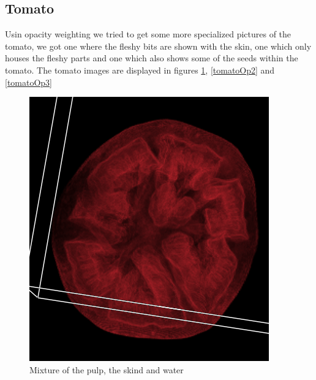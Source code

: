 \documentclass[a4paper,twoside,11pt]{article}
\begin{document}
 \subsection{Tomato}
 Usin opacity weighting we tried to get some more specialized pictures of the tomato, we got one where the fleshy bits are shown with the skin, one which only houses the fleshy parts and one which also shows some of the seeds within the tomato. The tomato images are displayed in figures \ref{tomatoOp}, \ref{tomatoOp2} and \ref{tomatoOp3}
 \begin{figure}[htb]
  \includegraphics[width=\linewidth]{images/tomatoOp}
  \caption{Mixture of the pulp, the skind and water}\label{tomatoOp}
\endminipage\hfill
{}

\end{figure}
\end{document}

